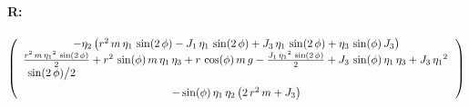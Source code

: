 \paragraph{R:} 
$$ \left(\begin{array}{c} -{\eta_2}\left(r^2\,m\,{\eta_1}\,\sin(2\,
\phi)-J_1\,{\eta_1}\,\sin(2\,\phi)+J_3\,{\eta_1}\,\sin(2\,\phi)+{\eta_
3}\,\sin(\phi)\,J_3\right) \cr  \vtop{\hbox{${}\frac{r^2\,m\,{{\eta_1}
}^2\,\sin(2\,\phi)}{2}+r^2\,\sin(\phi)\,m\,{\eta_1}\,{\eta_3}+r\,\cos(
\phi)\,m\,g-\frac{J_1\,{{\eta_1}}^2\,\sin(2\,\phi)}{2}+J_3\,\sin(\phi)
\,{\eta_1}\,{\eta_3}+J_3\,{{\eta_1}}^2\,$}\hbox{$\;{}\sin(2\,\phi)
\big/2$}\medskip}  \cr -\sin(\phi)\,{\eta_1}\,{\eta_2}\left(2\,r^2\,m+
J_3\right) \end{array} \right) $$
